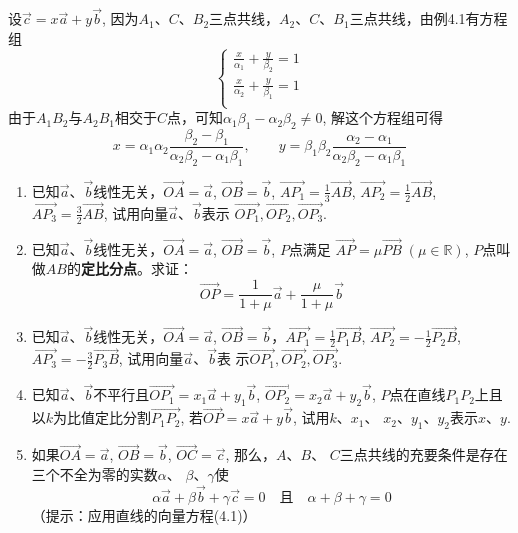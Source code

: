 \begin{solution}
    设$\vec{c}=x\vec{a}+y\vec{b}$, 因为$A_1$、$C$、$B_2$三点共线，$A_2$、$C$、$B_1$三点共线，由例4.1有方程组
\[\begin{cases}
    \frac{x}{\alpha_1}+\frac{y}{\beta_2}=1\\
    \frac{x}{\alpha_2}+\frac{y}{\beta_1}=1\\
\end{cases}\]
由于$A_1B_2$与$A_2B_1$相交于$C$点，可知$\alpha_1\beta_1-\alpha_2\beta_2\ne 0$, 解这个方程组可得
\[x=\alpha_1\alpha_2\frac{\beta_2-\beta_1}{\alpha_2\beta_2-\alpha_1\beta_1},\qquad y=\beta_1\beta_2\frac{\alpha_2-\alpha_1}{\alpha_2\beta_2-\alpha_1\beta_1}\]
\end{solution}

\begin{ex}
\begin{enumerate}
    \item 已知$\vec{a}$、$\vec{b}$线性无关，$\Vec{OA}=\vec{a}$, $\Vec{OB}=\vec{b}$, $\Vec{AP_1}=\frac{1}{3}\Vec{AB}$,
    $\Vec{AP_2}=\frac{1}{2}\Vec{AB}$, $\Vec{AP_3}=\frac{3}{2}\Vec{AB}$,
    试用向量$\vec{a}$、$\vec{b}$表示
    $\Vec{OP_1},\Vec{OP_2},\Vec{OP_3}$.

    \item 已知$\vec{a}$、$\vec{b}$线性无关，$\Vec{OA}=\vec{a}$, $\Vec{OB}=\vec{b}$, $P$点满足
    $\Vec{AP}=\mu \Vec{PB}\;  (\mu\in\mathbb{R})$, $P$点叫做$AB$的\textbf{定比分点}。求证：
\[\Vec{OP}=\frac{1}{1+\mu}\vec{a}+\frac{\mu}{1+\mu}\vec{b}\]
    \item 已知$\vec{a}$、$\vec{b}$线性无关，$\Vec{OA}=\vec{a}$, $\Vec{OB}=\vec{b}$，$\Vec{AP_1}=\frac{1}{2}\Vec{P_1B}$,
    $\Vec{AP_2}=-\frac{1}{2}\Vec{P_2B}$, $\Vec{AP_3}=-\frac{3}{2}\Vec{P_3B}$, 
    试用向量$\vec{a}$、$\vec{b}$表
    示$\Vec{OP_1},\Vec{OP_2},\Vec{OP_3}$.
    \item 已知$\vec{a}$、$\vec{b}$不平行且$\Vec{OP_1}=
    x_1\vec{a}+y_1\vec{b}$, $\Vec{OP_2}=x_2\vec{a}+y_2\vec{b}$, 
    $P$点在直线$P_1P_2$上且以$k$为比值定比分割$\Vec{P_1P_2}$,
    若$\Vec{OP}=x\vec{a}+y\vec{b}$, 
    试用$k$、$x_1$、
    $x_2$、$y_1$、$y_2$表示$x$、$y$.
    \item 如果$\Vec{OA}=\vec{a}$, $\Vec{OB}=\vec{b}$, $\Vec{OC}=\vec{c}$, 那么，$A$、$B$、
    $C$三点共线的充要条件是存在三个不全为零的实数$\alpha$、
    $\beta$、$\gamma$使
  \[  \alpha\vec{a}+\beta\vec{b}+\gamma\vec{c}=0\quad \text{且}\quad \alpha+\beta+\gamma=0\]
    （提示：应用直线的向量方程(4.1)）
\end{enumerate}
\end{ex}

